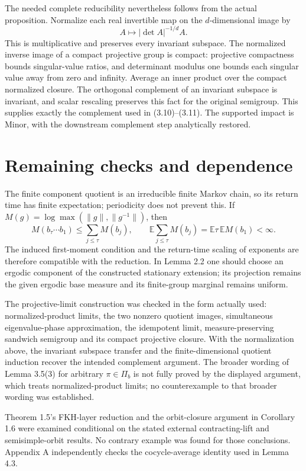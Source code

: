 \documentclass[10pt]{article}
\begin{document}
The needed complete reducibility nevertheless follows from the actual proposition. Normalize each real invertible map on the \(d\)-dimensional image by \[A\longmapsto |\det A|^{-1/d}A.\] This is multiplicative and preserves every invariant subspace. The normalized inverse image of a compact projective group is compact: projective compactness bounds singular-value ratios, and determinant modulus one bounds each singular value away from zero and infinity. Average an inner product over the compact normalized closure. The orthogonal complement of an invariant subspace is invariant, and scalar rescaling preserves this fact for the original semigroup. This supplies exactly the complement used in (3.10)–(3.11). The supported impact is Minor, with the downstream complement step analytically restored.\par
\section*{Remaining checks and dependence}
The finite component quotient is an irreducible finite Markov chain, so its return time has finite expectation; periodicity does not prevent this. If \(M(g)=\log\max(\|g\|,\|g^{-1}\|)\), then \[M(b_\tau\cdots b_1)\leq\sum_{j\leq\tau}M(b_j),\qquad
 \mathbb E\sum_{j\leq\tau}M(b_j)
 =\mathbb E\tau\,\mathbb E M(b_1)<\infty.\] The induced first-moment condition and the return-time scaling of exponents are therefore compatible with the reduction. In Lemma 2.2 one should choose an ergodic component of the constructed stationary extension; its projection remains the given ergodic base measure and its finite-group marginal remains uniform.\par
The projective-limit construction was checked in the form actually used: normalized-product limits, the two nonzero quotient images, simultaneous eigenvalue-phase approximation, the idempotent limit, measure-preserving sandwich semigroup and its compact projective closure. With the normalization above, the invariant subspace transfer and the finite-dimensional quotient induction recover the intended complement argument. The broader wording of Lemma 3.5(3) for arbitrary \(\pi\in\Pi_b\) is not fully proved by the displayed argument, which treats normalized-product limits; no counterexample to that broader wording was established.\par
Theorem 1.5’s FKH-layer reduction and the orbit-closure argument in Corollary 1.6 were examined conditional on the stated external contracting-lift and semisimple-orbit results. No contrary example was found for those conclusions. Appendix A independently checks the cocycle-average identity used in Lemma 4.3.\par
\end{document}
